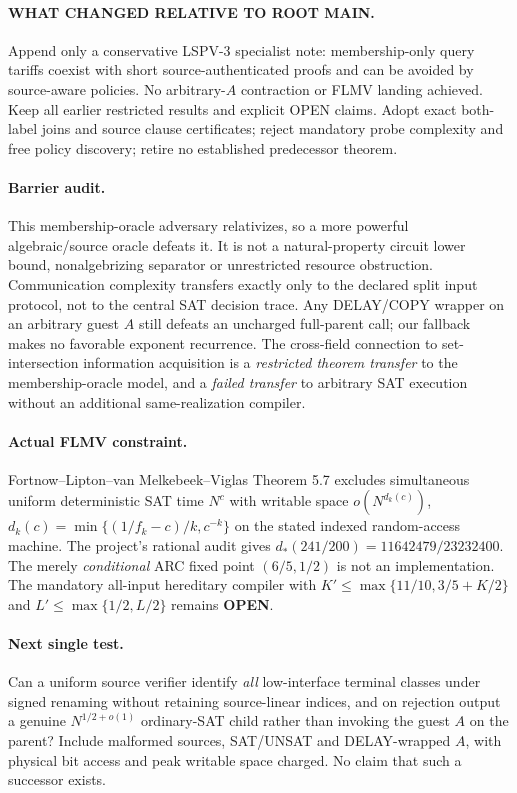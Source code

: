 \documentclass[11pt]{article}
\begin{document}
\paragraph{WHAT CHANGED RELATIVE TO ROOT MAIN.} Append only a conservative LSPV-3 specialist note: membership-only query tariffs coexist with short source-authenticated proofs and can be avoided by source-aware policies. No arbitrary-$A$ contraction or FLMV landing achieved. Keep all earlier restricted results and explicit OPEN claims. Adopt exact both-label joins and source clause certificates; reject mandatory probe complexity and free policy discovery; retire no established predecessor theorem.

\paragraph{Barrier audit.} This membership-oracle adversary relativizes, so a more powerful algebraic/source oracle defeats it. It is not a natural-property circuit lower bound, nonalgebrizing separator or unrestricted resource obstruction. Communication complexity transfers exactly only to the declared split input protocol, not to the central SAT decision trace. Any DELAY/COPY wrapper on an arbitrary guest $A$ still defeats an uncharged full-parent call; our fallback makes no favorable exponent recurrence. The cross-field connection to set-intersection information acquisition is a \emph{restricted theorem transfer} to the membership-oracle model, and a \emph{failed transfer} to arbitrary SAT execution without an additional same-realization compiler.

\paragraph{Actual FLMV constraint.} Fortnow--Lipton--van Melkebeek--Viglas Theorem 5.7 excludes simultaneous uniform deterministic SAT time $N^c$ with writable space $o(N^{d_k(c)})$, $d_k(c)=\min\{(1/f_k-c)/k,c^{-k}\}$ on the stated indexed random-access machine. The project's rational audit gives $d_*(241/200)=11642479/23232400$. The merely \emph{conditional} ARC fixed point $(6/5,1/2)$ is not an implementation. The mandatory all-input hereditary compiler with $K'\le\max\{11/10,3/5+K/2\}$ and $L'\le\max\{1/2,L/2\}$ remains \textbf{OPEN}.

\paragraph{Next single test.} Can a uniform source verifier identify \emph{all} low-interface terminal classes under signed renaming without retaining source-linear indices, and on rejection output a genuine $N^{1/2+o(1)}$ ordinary-SAT child rather than invoking the guest $A$ on the parent? Include malformed sources, SAT/UNSAT and DELAY-wrapped $A$, with physical bit access and peak writable space charged. No claim that such a successor exists.
\end{document}
